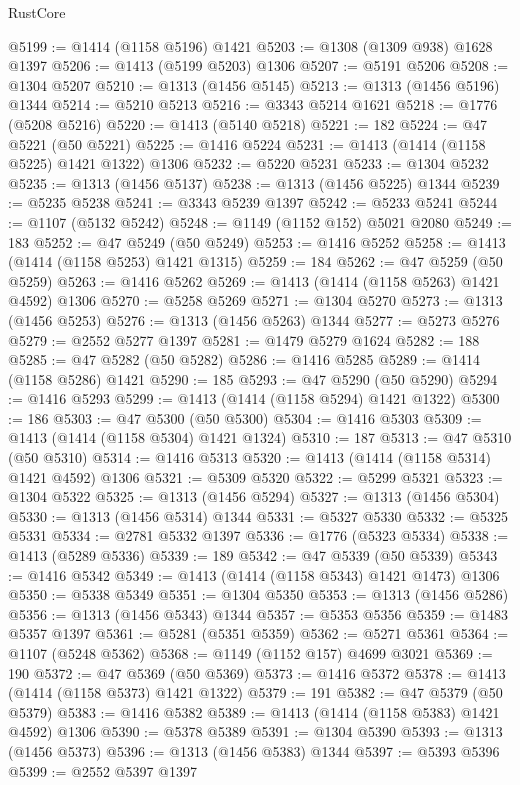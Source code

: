 \begin{lexlean}{RustCore}
\begin{coremodule}
@5199 := @1414 (@1158 @5196) @1421
@5203 := @1308 (@1309 @938) @1628 @1397
@5206 := @1413 (@5199 @5203) @1306
@5207 := @5191 @5206
@5208 := @1304 @5207
@5210 := @1313 (@1456 @5145)
@5213 := @1313 (@1456 @5196) @1344
@5214 := @5210 @5213
@5216 := @3343 @5214 @1621
@5218 := @1776 (@5208 @5216)
@5220 := @1413 (@5140 @5218)
@5221 := 182
@5224 := @47 @5221 (@50 @5221)
@5225 := @1416 @5224
@5231 := @1413 (@1414 (@1158 @5225) @1421 @1322) @1306
@5232 := @5220 @5231
@5233 := @1304 @5232
@5235 := @1313 (@1456 @5137)
@5238 := @1313 (@1456 @5225) @1344
@5239 := @5235 @5238
@5241 := @3343 @5239 @1397
@5242 := @5233 @5241
@5244 := @1107 (@5132 @5242)
@5248 := @1149 (@1152 @152) @5021 @2080
@5249 := 183
@5252 := @47 @5249 (@50 @5249)
@5253 := @1416 @5252
@5258 := @1413 (@1414 (@1158 @5253) @1421 @1315)
@5259 := 184
@5262 := @47 @5259 (@50 @5259)
@5263 := @1416 @5262
@5269 := @1413 (@1414 (@1158 @5263) @1421 @4592) @1306
@5270 := @5258 @5269
@5271 := @1304 @5270
@5273 := @1313 (@1456 @5253)
@5276 := @1313 (@1456 @5263) @1344
@5277 := @5273 @5276
@5279 := @2552 @5277 @1397
@5281 := @1479 @5279 @1624
@5282 := 188
@5285 := @47 @5282 (@50 @5282)
@5286 := @1416 @5285
@5289 := @1414 (@1158 @5286) @1421
@5290 := 185
@5293 := @47 @5290 (@50 @5290)
@5294 := @1416 @5293
@5299 := @1413 (@1414 (@1158 @5294) @1421 @1322)
@5300 := 186
@5303 := @47 @5300 (@50 @5300)
@5304 := @1416 @5303
@5309 := @1413 (@1414 (@1158 @5304) @1421 @1324)
@5310 := 187
@5313 := @47 @5310 (@50 @5310)
@5314 := @1416 @5313
@5320 := @1413 (@1414 (@1158 @5314) @1421 @4592) @1306
@5321 := @5309 @5320
@5322 := @5299 @5321
@5323 := @1304 @5322
@5325 := @1313 (@1456 @5294)
@5327 := @1313 (@1456 @5304)
@5330 := @1313 (@1456 @5314) @1344
@5331 := @5327 @5330
@5332 := @5325 @5331
@5334 := @2781 @5332 @1397
@5336 := @1776 (@5323 @5334)
@5338 := @1413 (@5289 @5336)
@5339 := 189
@5342 := @47 @5339 (@50 @5339)
@5343 := @1416 @5342
@5349 := @1413 (@1414 (@1158 @5343) @1421 @1473) @1306
@5350 := @5338 @5349
@5351 := @1304 @5350
@5353 := @1313 (@1456 @5286)
@5356 := @1313 (@1456 @5343) @1344
@5357 := @5353 @5356
@5359 := @1483 @5357 @1397
@5361 := @5281 (@5351 @5359)
@5362 := @5271 @5361
@5364 := @1107 (@5248 @5362)
@5368 := @1149 (@1152 @157) @4699 @3021
@5369 := 190
@5372 := @47 @5369 (@50 @5369)
@5373 := @1416 @5372
@5378 := @1413 (@1414 (@1158 @5373) @1421 @1322)
@5379 := 191
@5382 := @47 @5379 (@50 @5379)
@5383 := @1416 @5382
@5389 := @1413 (@1414 (@1158 @5383) @1421 @4592) @1306
@5390 := @5378 @5389
@5391 := @1304 @5390
@5393 := @1313 (@1456 @5373)
@5396 := @1313 (@1456 @5383) @1344
@5397 := @5393 @5396
@5399 := @2552 @5397 @1397

\end{coremodule}
\end{lexlean}
